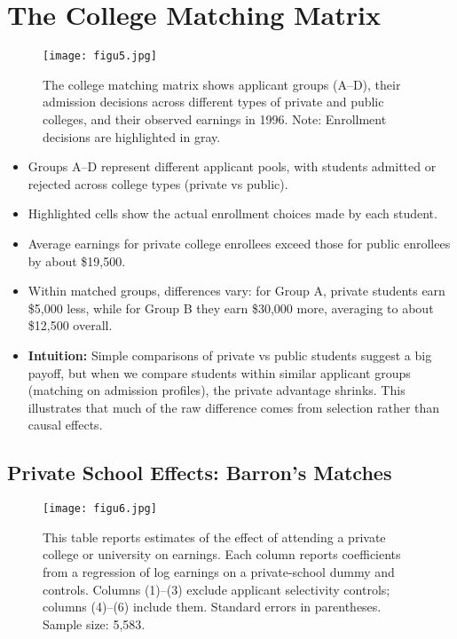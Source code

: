 \documentclass[12pt]{article}
\begin{document}
\section*{\noindent\textbf{The College Matching Matrix}}

\begin{figure}[H]
    \centering
    \texttt{[image: figu5.jpg]} %
    \caption*{The college matching matrix shows applicant groups (A–D), their admission decisions across different types of private and public colleges, and their observed earnings in 1996. 
    Note: Enrollment decisions are highlighted in gray.}
\end{figure}

\begin{itemize}
    \item Groups A–D represent different applicant pools, with students admitted or rejected across college types (private vs public).  
    \item Highlighted cells show the actual enrollment choices made by each student.  
    \item Average earnings for private college enrollees exceed those for public enrollees by about \$19,500.  
    \item Within matched groups, differences vary: for Group A, private students earn \$5,000 less, while for Group B they earn \$30,000 more, averaging to about \$12,500 overall.  
\end{itemize}

\begin{itemize}
    \item \textbf{Intuition:} Simple comparisons of private vs public students suggest a big payoff, but when we compare students within similar applicant groups (matching on admission profiles), the private advantage shrinks. This illustrates that much of the raw difference comes from selection rather than causal effects.
\end{itemize}

\subsection*{\noindent\textbf{Private School Effects: Barron’s Matches}}

\begin{figure}[H]
    \centering
    \texttt{[image: figu6.jpg]} %
    \caption*{This table reports estimates of the effect of attending a private college or university on earnings. 
    Each column reports coefficients from a regression of log earnings on a private-school dummy and controls. 
    Columns (1)–(3) exclude applicant selectivity controls; columns (4)–(6) include them. 
    Standard errors in parentheses. Sample size: 5,583.}
\end{figure}
\end{document}
